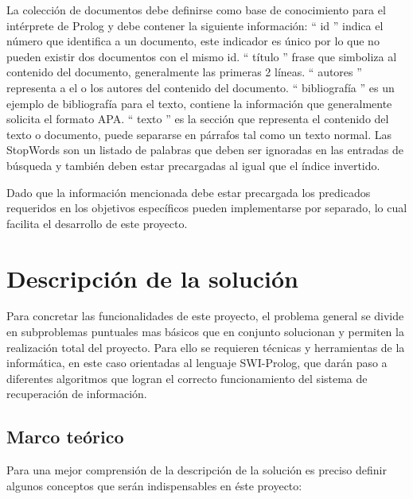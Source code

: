\documentclass[letterpaper,12pt]{report}
\begin{document}
La colección de documentos debe definirse como base de conocimiento para el intérprete de Prolog y debe contener la siguiente información: `` id '' indica el número que identifica a un documento, este indicador es único por lo que no pueden existir dos documentos con el mismo id. `` título '' frase que simboliza al contenido del documento, generalmente las primeras 2 líneas. `` autores '' representa a el o los autores del contenido del documento. `` bibliografía '' es un ejemplo de bibliografía para el texto, contiene la información que generalmente solicita el formato APA. `` texto '' es la sección que representa el contenido del texto o documento, puede separarse en párrafos tal como un texto normal. Las StopWords son un listado de palabras que deben ser ignoradas en las entradas de búsqueda y también deben estar precargadas al igual que el índice invertido.

Dado que la información mencionada debe estar precargada los predicados requeridos en los objetivos específicos pueden implementarse por separado, lo cual facilita el desarrollo de este proyecto.

\chapter{Descripción de la solución}

Para concretar las funcionalidades de este proyecto, el problema general se divide en subproblemas puntuales mas básicos que en conjunto solucionan y permiten la realización total del proyecto. Para ello se requieren técnicas y herramientas de la informática, en este caso orientadas al lenguaje SWI-Prolog, que darán paso a diferentes algoritmos que logran el correcto funcionamiento del sistema de recuperación de información.

\section {Marco teórico}

Para una mejor comprensión de la descripción de la solución es preciso definir algunos conceptos que
serán indispensables en éste proyecto:
\end{document}
